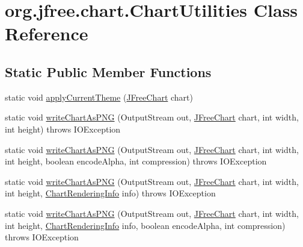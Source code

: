 \hypertarget{classorg_1_1jfree_1_1chart_1_1_chart_utilities}{}\section{org.\+jfree.\+chart.\+Chart\+Utilities Class Reference}
\label{classorg_1_1jfree_1_1chart_1_1_chart_utilities}
\subsection*{Static Public Member Functions}
\begin{DoxyCompactItemize}
\item 
static void \mbox{\hyperlink{classorg_1_1jfree_1_1chart_1_1_chart_utilities_a2689d5e3124cb8d038a61cd8f2f68d51}{apply\+Current\+Theme}} (\mbox{\hyperlink{classorg_1_1jfree_1_1chart_1_1_j_free_chart}{J\+Free\+Chart}} chart)
\item 
static void \mbox{\hyperlink{classorg_1_1jfree_1_1chart_1_1_chart_utilities_a004f91b5212cb6594f558101d28a58a6}{write\+Chart\+As\+P\+NG}} (Output\+Stream out, \mbox{\hyperlink{classorg_1_1jfree_1_1chart_1_1_j_free_chart}{J\+Free\+Chart}} chart, int width, int height)  throws I\+O\+Exception 
\item 
static void \mbox{\hyperlink{classorg_1_1jfree_1_1chart_1_1_chart_utilities_ad9bcb393aded98b421a090a5726af0f0}{write\+Chart\+As\+P\+NG}} (Output\+Stream out, \mbox{\hyperlink{classorg_1_1jfree_1_1chart_1_1_j_free_chart}{J\+Free\+Chart}} chart, int width, int height, boolean encode\+Alpha, int compression)  throws I\+O\+Exception 
\item 
static void \mbox{\hyperlink{classorg_1_1jfree_1_1chart_1_1_chart_utilities_a8eeedd472785f337152b8f31c869f421}{write\+Chart\+As\+P\+NG}} (Output\+Stream out, \mbox{\hyperlink{classorg_1_1jfree_1_1chart_1_1_j_free_chart}{J\+Free\+Chart}} chart, int width, int height, \mbox{\hyperlink{classorg_1_1jfree_1_1chart_1_1_chart_rendering_info}{Chart\+Rendering\+Info}} info)  throws I\+O\+Exception 
\item 
static void \mbox{\hyperlink{classorg_1_1jfree_1_1chart_1_1_chart_utilities_a6cd1eac5a52c40a0e1110054b77e519c}{write\+Chart\+As\+P\+NG}} (Output\+Stream out, \mbox{\hyperlink{classorg_1_1jfree_1_1chart_1_1_j_free_chart}{J\+Free\+Chart}} chart, int width, int height, \mbox{\hyperlink{classorg_1_1jfree_1_1chart_1_1_chart_rendering_info}{Chart\+Rendering\+Info}} info, boolean encode\+Alpha, int compression)  throws I\+O\+Exception 

\end{DoxyCompactItemize}
